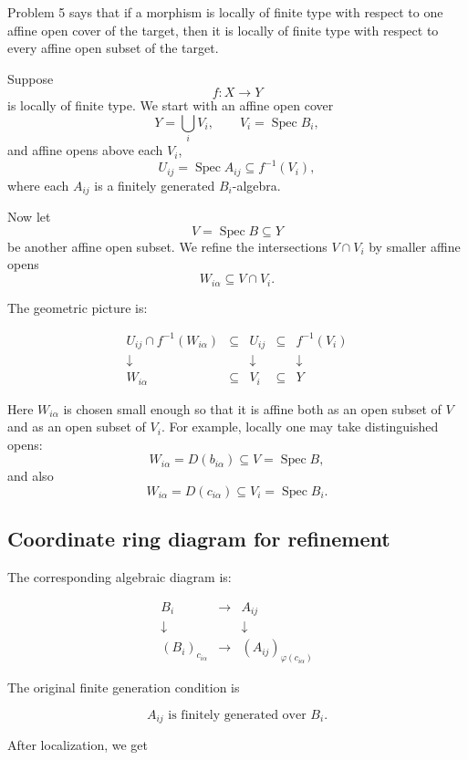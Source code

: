 \documentclass[12pt,a4paper]{article}
\theoremstyle{notespace}
\begin{document}
Problem 5 says that if a morphism is locally of finite type with respect to one affine open cover of the target, then it is locally of finite type with respect to every affine open subset of the target.

Suppose
\[
f:X\to Y
\]
is locally of finite type. We start with an affine open cover
\[
Y=\bigcup_i V_i,
\qquad
V_i=\operatorname{Spec} B_i,
\]
and affine opens above each \(V_i\),
\[
U_{ij}=\operatorname{Spec} A_{ij}
\subseteq f^{-1}(V_i),
\]
where each \(A_{ij}\) is a finitely generated \(B_i\)-algebra.

Now let
\[
V=\operatorname{Spec} B\subseteq Y
\]
be another affine open subset. We refine the intersections \(V\cap V_i\) by smaller affine opens
\[
W_{i\alpha}\subseteq V\cap V_i.
\]

The geometric picture is:

\[
\begin{array}{ccccc}
	U_{ij}\cap f^{-1}(W_{i\alpha})
	&\subseteq&
	U_{ij}
	&\subseteq&
	f^{-1}(V_i)
	\\[6pt]
	\downarrow
	&&
	\downarrow
	&&
	\downarrow
	\\[6pt]
	W_{i\alpha}
	&\subseteq&
	V_i
	&\subseteq&
	Y
\end{array}
\]

Here \(W_{i\alpha}\) is chosen small enough so that it is affine both as an open subset of \(V\) and as an open subset of \(V_i\). For example, locally one may take distinguished opens:
\[
W_{i\alpha}=D(b_{i\alpha})\subseteq V=\operatorname{Spec} B,
\]
and also
\[
W_{i\alpha}=D(c_{i\alpha})\subseteq V_i=\operatorname{Spec} B_i.
\]

\subsection{Coordinate ring diagram for refinement}

The corresponding algebraic diagram is:

\[
\begin{array}{ccc}
	B_i & \longrightarrow & A_{ij}
	\\[6pt]
	\downarrow && \downarrow
	\\[6pt]
	(B_i)_{c_{i\alpha}}
	& \longrightarrow &
	(A_{ij})_{\varphi(c_{i\alpha})}
\end{array}
\]

The original finite generation condition is

\[
A_{ij}
\text{ is finitely generated over }
B_i.
\]

After localization, we get
\end{document}
